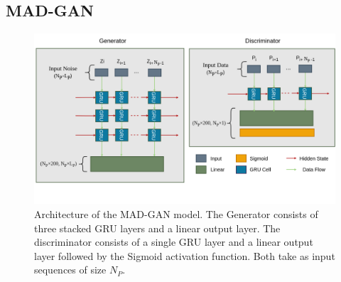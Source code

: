 



\subsection{MAD-GAN}\label{sec:madgan}

\begin{figure}[h]
    \centering
    \includegraphics[width=\textwidth]{figures/madgan_arch.png}
    \caption[MAD-GAN Architecture]{Architecture of the MAD-GAN model. The Generator consists of three stacked GRU layers and a linear output layer. The discriminator consists of a single GRU layer and a linear output layer followed by the Sigmoid activation function. Both take as input sequences of size $N_P$.}
    \label{fig:madgan_architecture}
\end{figure}

